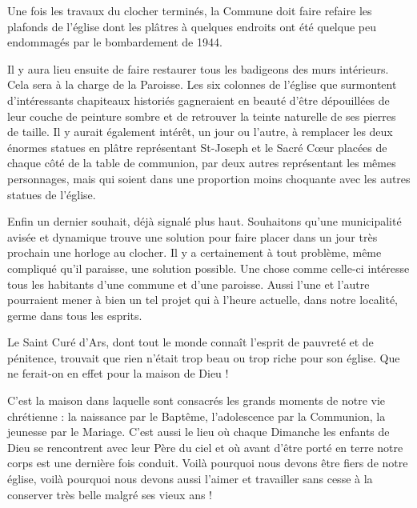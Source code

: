 Une fois les travaux du clocher terminés, la Commune doit faire refaire les plafonds de l'église dont les plâtres à quelques endroits ont été quelque peu endommagés par le bombardement de 1944.

Il y aura lieu ensuite de faire restaurer tous les badigeons des murs intérieurs. Cela sera à la charge de la Paroisse. Les six colonnes de l'église que surmontent d'intéressants chapiteaux historiés gagneraient en beauté d'être dépouillées de leur couche de peinture sombre et de retrouver la teinte naturelle de ses pierres de taille. Il y aurait également intérêt, un jour ou l'autre, à remplacer les deux énormes statues en plâtre représentant St-Joseph et le Sacré Cœur placées de chaque côté de la table de communion, par deux autres représentant les mêmes personnages, mais qui soient dans une proportion moins choquante avec les autres statues de l'église.

Enfin un dernier souhait, déjà signalé plus haut. Souhaitons qu'une municipalité avisée et dynamique trouve une solution pour faire placer dans un jour très prochain une horloge au clocher. Il y a certainement à tout problème, même compliqué qu'il paraisse, une solution possible. Une chose comme celle-ci intéresse tous les habitants d'une commune et d'une paroisse. Aussi l'une et l'autre pourraient mener à bien un tel projet qui à l'heure actuelle, dans notre localité, germe dans tous les esprits.

Le Saint Curé d'Ars, dont tout le monde connaît l'esprit de pauvreté et de pénitence, trouvait que rien n'était trop beau ou trop riche pour son église. Que ne ferait-on en effet pour la maison de Dieu !

C'est la maison dans laquelle sont consacrés les grands moments de notre vie chrétienne : la naissance par le Baptême, l'adolescence par la Communion, la jeunesse par le Mariage. C'est aussi le lieu où chaque Dimanche les enfants de Dieu se rencontrent avec leur Père du ciel et où avant d'être porté en terre notre corps est une dernière fois conduit. Voilà pourquoi nous devons être fiers de notre église, voilà pourquoi nous devons aussi l'aimer et travailler sans cesse à la conserver très belle malgré ses vieux ans !
